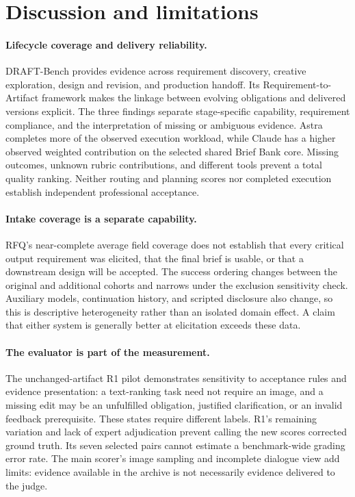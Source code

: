 \section{Discussion and limitations}
\label{sec:discussion}
\paragraph{Lifecycle coverage and delivery reliability.}
DRAFT-Bench provides evidence across requirement discovery, creative exploration, design and revision, and production handoff. Its Requirement-to-Artifact framework makes the linkage between evolving obligations and delivered versions explicit. The three findings separate stage-specific capability, requirement compliance, and the interpretation of missing or ambiguous evidence. Astra completes more of the observed execution workload, while Claude has a higher observed weighted contribution on the selected shared Brief Bank core. Missing outcomes, unknown rubric contributions, and different tools prevent a total quality ranking. Neither routing and planning scores nor completed execution establish independent professional acceptance.

\paragraph{Intake coverage is a separate capability.}
RFQ's near-complete average field coverage does not establish that every critical output requirement was elicited, that the final brief is usable, or that a downstream design will be accepted. The success ordering changes between the original and additional cohorts and narrows under the exclusion sensitivity check. Auxiliary models, continuation history, and scripted disclosure also change, so this is descriptive heterogeneity rather than an isolated domain effect. A claim that either system is generally better at elicitation exceeds these data.

\paragraph{The evaluator is part of the measurement.}
The unchanged-artifact R1 pilot demonstrates sensitivity to acceptance rules and evidence presentation: a text-ranking task need not require an image, and a missing edit may be an unfulfilled obligation, justified clarification, or an invalid feedback prerequisite. These states require different labels. R1's remaining variation and lack of expert adjudication prevent calling the new scores corrected ground truth. Its seven selected pairs cannot estimate a benchmark-wide grading error rate. The main scorer's image sampling and incomplete dialogue view add limits: evidence available in the archive is not necessarily evidence delivered to the judge.

